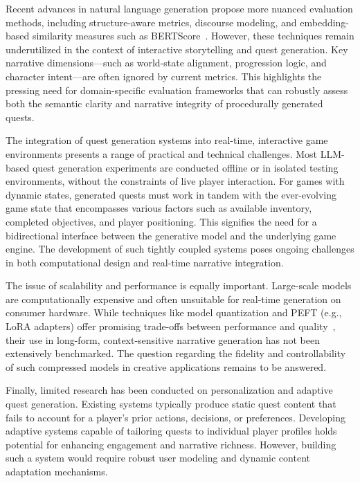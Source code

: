 Recent advances in natural language generation propose more nuanced evaluation
methods, including structure-aware metrics, discourse modeling, and embedding-based
similarity measures such as BERTScore~\cite{zhang2019bertscore}. However, these techniques remain underutilized
in the context of interactive storytelling and quest generation. Key narrative
dimensions—such as world-state alignment, progression logic, and character intent—are
often ignored by current metrics. This highlights the pressing need for domain-specific
evaluation frameworks that can robustly assess both the semantic clarity and narrative
integrity of procedurally generated quests.

The integration of quest generation systems into real-time, interactive game environments
presents a range of practical and technical challenges. Most LLM-based quest
generation experiments are conducted offline or in isolated testing environments, without
the constraints of live player interaction. For games with dynamic states, generated quests
must work in tandem with the ever-evolving game state that encompasses various factors
such as available inventory, completed objectives, and player positioning. This signifies
the need for a bidirectional interface between the generative model and the underlying
game engine. The development of such tightly coupled systems poses ongoing challenges
in both computational design and real-time narrative integration.

The issue of scalability and performance is equally important. Large-scale models
are computationally expensive and often unsuitable for real-time generation on consumer
hardware. While techniques like model quantization and PEFT (e.g., LoRA adapters)
offer promising trade-offs between performance and quality~\cite{hu2022lora}, their use in long-form,
context-sensitive narrative generation has not been extensively benchmarked. The question
regarding the fidelity and controllability of such compressed models in creative applications
remains to be answered.

Finally, limited research has been conducted on personalization and adaptive quest
generation. Existing systems typically produce static quest content that fails to account
for a player's prior actions, decisions, or preferences. Developing adaptive systems capable
of tailoring quests to individual player profiles holds potential for enhancing engagement
and narrative richness. However, building such a system would require robust user modeling
and dynamic content adaptation mechanisms.

